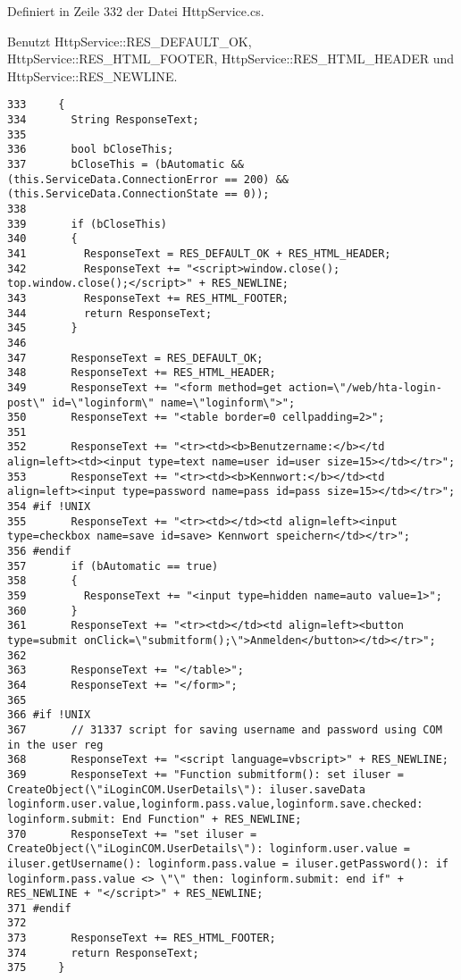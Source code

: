 Definiert in Zeile 332 der Datei Http\-Service.cs.

Benutzt Http\-Service::RES\_\-DEFAULT\_\-OK, Http\-Service::RES\_\-HTML\_\-FOOTER, Http\-Service::RES\_\-HTML\_\-HEADER und Http\-Service::RES\_\-NEWLINE.



\footnotesize\begin{verbatim}333     {
334       String ResponseText;
335 
336       bool bCloseThis;
337       bCloseThis = (bAutomatic && (this.ServiceData.ConnectionError == 200) && (this.ServiceData.ConnectionState == 0));
338         
339       if (bCloseThis)
340       {
341         ResponseText = RES_DEFAULT_OK + RES_HTML_HEADER; 
342         ResponseText += "<script>window.close(); top.window.close();</script>" + RES_NEWLINE;
343         ResponseText += RES_HTML_FOOTER;
344         return ResponseText;
345       }
346         
347       ResponseText = RES_DEFAULT_OK;
348       ResponseText += RES_HTML_HEADER;
349       ResponseText += "<form method=get action=\"/web/hta-login-post\" id=\"loginform\" name=\"loginform\">";
350       ResponseText += "<table border=0 cellpadding=2>";
351 
352       ResponseText += "<tr><td><b>Benutzername:</b></td align=left><td><input type=text name=user id=user size=15></td></tr>";
353       ResponseText += "<tr><td><b>Kennwort:</b></td><td align=left><input type=password name=pass id=pass size=15></td></tr>";
354 #if !UNIX
355       ResponseText += "<tr><td></td><td align=left><input type=checkbox name=save id=save> Kennwort speichern</td></tr>";
356 #endif
357       if (bAutomatic == true)
358       {
359         ResponseText += "<input type=hidden name=auto value=1>";
360       }
361       ResponseText += "<tr><td></td><td align=left><button type=submit onClick=\"submitform();\">Anmelden</button></td></tr>";
362 
363       ResponseText += "</table>";
364       ResponseText += "</form>";
365 
366 #if !UNIX
367       // 31337 script for saving username and password using COM in the user reg
368       ResponseText += "<script language=vbscript>" + RES_NEWLINE;
369       ResponseText += "Function submitform(): set iluser = CreateObject(\"iLoginCOM.UserDetails\"): iluser.saveData loginform.user.value,loginform.pass.value,loginform.save.checked: loginform.submit: End Function" + RES_NEWLINE;
370       ResponseText += "set iluser = CreateObject(\"iLoginCOM.UserDetails\"): loginform.user.value = iluser.getUsername(): loginform.pass.value = iluser.getPassword(): if loginform.pass.value <> \"\" then: loginform.submit: end if" + RES_NEWLINE + "</script>" + RES_NEWLINE;
371 #endif
372 
373       ResponseText += RES_HTML_FOOTER;
374       return ResponseText;
375     }
\end{verbatim}\normalsize 
